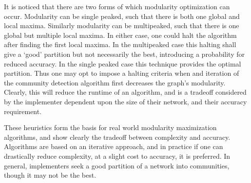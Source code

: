 \documentclass[a4paper, 10pt, twocolumn]{article}
\begin{document}
It is noticed that there are two forms of which modularity optimization can occur. 
Modularity can be single peaked, such that there is both one global and local maxima. 
Similarly modularity can be multipeaked, such that there is one global but multiple local maxima. 
In either case, one could halt the algorithm after finding the first local maxima. 
In the multipeaked case this halting shall give a `good' partition but not necessarily the best, introducing a probability for reduced accuracy. 
In the single peaked case this technique provides the optimal partition. 
Thus one may opt to impose a halting criteria when and iteration of the community detection algorithm first decreases the graph's modularity.
Clearly, this will reduce the runtime of an algorithm, and is a tradeoff considered by the implementer dependent upon the size of their network, and their accuracy requirement. 

These heuristics form the basis for real world modularity maximization algorithms, and show clearly the tradeoff between complexity and accuracy. 
Algorithms are based on an iterative approach, and in practice if one can drastically reduce complexity, at a slight cost to accuracy, it is preferred. 
In general, implementers seek a good partition of a network into communities, though it may not be the best. 
\end{document}
